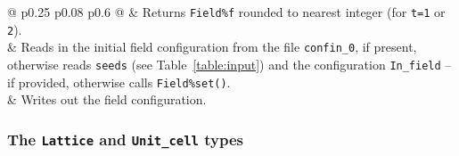 \begin{table}[h]
\begin{center}
\begin{tabular}{@{} p{} p{} p{} @{}}
		     & Returns \texttt{Field\%f} rounded to nearest integer (for \texttt{t=1} or \texttt{2}). \\
		 & Reads in the initial field configuration from the file \texttt{confin\_0}, if present, otherwise reads \texttt{seeds} (see Table~\ref{table:input}) and the configuration \texttt{In\_field} -- if provided, otherwise calls \texttt{Field\%set()}. \\
		    & Writes out the field configuration.    \\\bottomrule
	\end{tabular}
	\caption{Components of a variable of type \texttt{Fields} named \texttt{Field}, where 
		\texttt{del} (real) denotes the \texttt{Field\%del}, \texttt{n\_op} and \texttt{n\_tau} (integers) are the number of operators and time slices, respectively, \texttt{Group\_Comm} (integer) defines an MPI communicator, and the optional \texttt{In\_field} stores the initial field configuration.}
    \end{center}
	\label{table:Fields}
\end{table}
%



\subsubsection{The \texttt{Lattice} and \texttt{Unit\_cell} types}\label{sec:latt}

